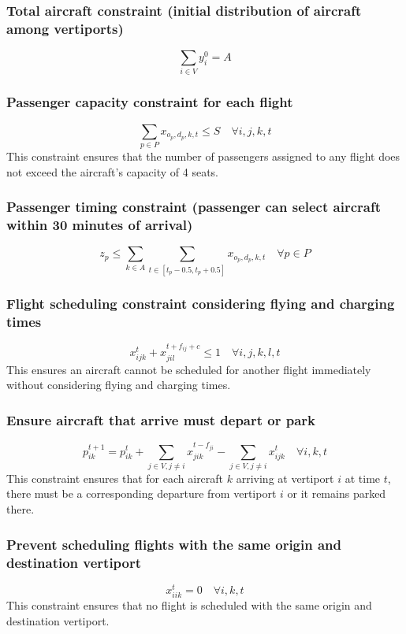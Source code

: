 \documentclass{article}
\begin{document}
\subsubsection{Total aircraft constraint (initial distribution of aircraft among vertiports)}
\[
\sum_{i \in V} y_i^0 = A
\]

\subsubsection{Passenger capacity constraint for each flight}
\[
\sum_{p \in P} x_{o_p, d_p, k, t} \leq S \quad \forall i, j, k, t
\]
This constraint ensures that the number of passengers assigned to any flight does not exceed the aircraft's capacity of 4 seats.

\subsubsection{Passenger timing constraint (passenger can select aircraft within 30 minutes of arrival)}
\[
z_p \leq \sum_{k \in A} \sum_{t \in [t_p - 0.5, t_p + 0.5]} x_{o_p, d_p, k, t} \quad \forall p \in P
\]

\subsubsection{Flight scheduling constraint considering flying and charging times}
\[
x_{ijk}^t + x_{jil}^{t+f_{ij}+c} \leq 1 \quad \forall i, j, k, l, t
\]
This ensures an aircraft cannot be scheduled for another flight immediately without considering flying and charging times.

\subsubsection{Ensure aircraft that arrive must depart or park}
\[
p_{ik}^{t+1} = p_{ik}^t + \sum_{j \in V, j \neq i} x_{jik}^{t-f_{ji}} - \sum_{j \in V, j \neq i} x_{ijk}^t \quad \forall i, k, t
\]
This constraint ensures that for each aircraft $k$ arriving at vertiport $i$ at time $t$, there must be a corresponding departure from vertiport $i$ or it remains parked there.

\subsubsection{Prevent scheduling flights with the same origin and destination vertiport}
\[
x_{iik}^t = 0 \quad \forall i, k, t
\]
This constraint ensures that no flight is scheduled with the same origin and destination vertiport.
\end{document}
